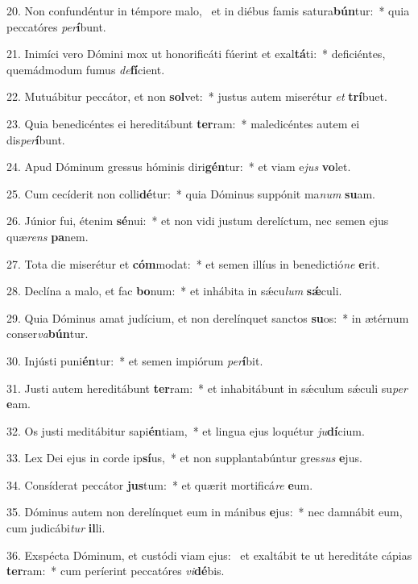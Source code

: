 20. Non confundéntur in témpore malo, \dag\  et in diébus famis satura\textbf{bún}tur:~*  quia peccatóres \textit{per}\textbf{í}bunt.\

21. Inimíci vero Dómini mox ut honorificáti fúerint et exal\textbf{tá}ti:~*  deficiéntes, quemádmodum fumus \textit{de}\textbf{fí}cient.\

22. Mutuábitur peccátor, et non \textbf{sol}vet:~*  justus autem miserétur \textit{et} \textbf{trí}buet.\

23. Quia benedicéntes ei hereditábunt \textbf{ter}ram:~*  maledicéntes autem ei dis\textit{per}\textbf{í}bunt.\

24. Apud Dóminum gressus hóminis diri\textbf{gén}tur:~*  et viam e\textit{jus} \textbf{vo}let.\

25. Cum cecíderit non colli\textbf{dé}tur:~*  quia Dóminus suppónit ma\textit{num} \textbf{su}am.\

26. Júnior fui, étenim \textbf{sé}nui:~*  et non vidi justum derelíctum, nec semen ejus quæ\textit{rens} \textbf{pa}nem.\

27. Tota die miserétur et \textbf{cóm}modat:~*  et semen illíus in benedictió\textit{ne} \textbf{e}rit.\

28. Declína a malo, et fac \textbf{bo}num:~*  et inhábita in sǽcu\textit{lum} \textbf{sǽ}culi.\

29. Quia Dóminus amat judícium, et non derelínquet sanctos \textbf{su}os:~*  in ætérnum conser\textit{va}\textbf{bún}tur.\

30. Injústi puni\textbf{én}tur:~*  et semen impiórum \textit{per}\textbf{í}bit.\

31. Justi autem hereditábunt \textbf{ter}ram:~*  et inhabitábunt in sǽculum sǽculi su\textit{per} \textbf{e}am.\

32. Os justi meditábitur sapi\textbf{én}tiam,~*  et lingua ejus loquétur \textit{ju}\textbf{dí}cium.\

33. Lex Dei ejus in corde ip\textbf{sí}us,~*  et non supplantabúntur gres\textit{sus} \textbf{e}jus.\

34. Consíderat peccátor \textbf{jus}tum:~*  et quærit mortificá\textit{re} \textbf{e}um.\

35. Dóminus autem non derelínquet eum in mánibus \textbf{e}jus:~*  nec damnábit eum, cum judicábi\textit{tur} \textbf{il}li.\

36. Exspécta Dóminum, et custódi viam ejus: \dag\  et exaltábit te ut hereditáte cápias \textbf{ter}ram:~*  cum períerint peccatóres \textit{vi}\textbf{dé}bis.\

